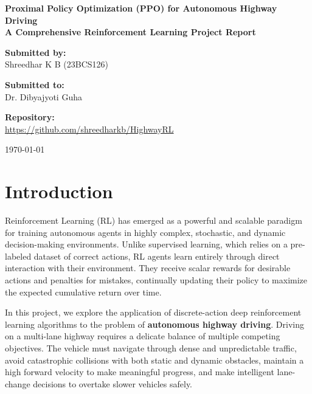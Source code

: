 \documentclass[12pt, a4paper]{article}
\begin{document}
\begin{titlepage}
    \vspace*{2cm}
    \begin{center}
        {\Huge \textbf{Proximal Policy Optimization (PPO) for Autonomous Highway Driving}} \\
        \vspace{1.5cm}
        {\Large \textbf{A Comprehensive Reinforcement Learning Project Report}} \\
        \vspace{2cm}
        
        \textbf{Submitted by:} \\
        \vspace{0.2cm}
        {\large Shreedhar K B (23BCS126)} \\
        \vspace{1.5cm}
        
        \textbf{Submitted to:} \\
        \vspace{0.2cm}
        {\large Dr. Dibyajyoti Guha} \\
        \vspace{2.5cm}
        
        \textbf{Repository:} \\
        \url{https://github.com/shreedharkb/HighwayRL} \\
        \vspace{3cm}
        
        {\large \today}
    \end{center}
\end{titlepage}

\newpage
\tableofcontents
\newpage

\section{Introduction}
Reinforcement Learning (RL) has emerged as a powerful and scalable paradigm for training autonomous agents in highly complex, stochastic, and dynamic decision-making environments. Unlike supervised learning, which relies on a pre-labeled dataset of correct actions, RL agents learn entirely through direct interaction with their environment. They receive scalar rewards for desirable actions and penalties for mistakes, continually updating their policy to maximize the expected cumulative return over time. 

In this project, we explore the application of discrete-action deep reinforcement learning algorithms to the problem of \textbf{autonomous highway driving}. Driving on a multi-lane highway requires a delicate balance of multiple competing objectives. The vehicle must navigate through dense and unpredictable traffic, avoid catastrophic collisions with both static and dynamic obstacles, maintain a high forward velocity to make meaningful progress, and make intelligent lane-change decisions to overtake slower vehicles safely.
\end{document}
